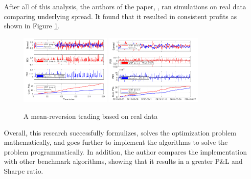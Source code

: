 \noindent After all of this analysis, the authors of the paper, \cite{8450775, ZipingZhao2019OMPW}, ran simulations on real data comparing underlying spread. It found that it resulted in consistent profits as shown in Figure \ref{fig:ROIsMRP}.
\\[5mm]
\begin{figure}[htb!]
    \centering
    \includegraphics[width=0.4\textwidth]{background/Images/rois1.png}
    \includegraphics[width=0.43\textwidth]{background/Images/rois2.png}
    \caption{A mean-reversion trading based on real data~\cite{ZipingZhao2019OMPW}}
    \label{fig:ROIsMRP}
\end{figure}

\noindent Overall, this research successfully formulizes, solves the optimization problem mathematically, and goes further to implement the algorithms to solve the problem programmatically. In addition, the author compares the implementation with other benchmark algorithms, showing that it results in a greater P\&L and Sharpe ratio.